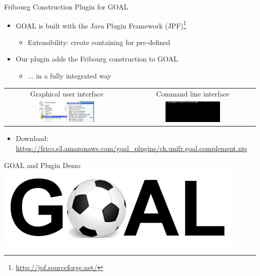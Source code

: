 \documentclass[12pt,handout]{beamer}
\begin{document}
\begin{frame}{Fribourg Construction Plugin for GOAL}
\begin{itemize}
\item GOAL is built with the Java Plugin Framework (JPF)\footnote{\scriptsize\url{http://jpf.sourceforge.net/}}
  \begin{itemize}
  \item Extensibility: create  containing  for pre-defined 
  \end{itemize}
\item Our plugin adds the Fribourg construction to GOAL
  \begin{itemize}
  \item $\dots$ in a fully integrated way
  \end{itemize}
\end{itemize}
\centering
\begin{tabular}{cc}
\footnotesize Graphical user interface & \footnotesize Command line interface \\
\includegraphics[width=0.46\textwidth]{figures/plugin_gui.png} &
\includegraphics[width=0.46\textwidth]{figures/plugin_cl.png}
\end{tabular}
\begin{itemize}
\item Download: \url{https://frico.s3.amazonaws.com/goal_plugins/ch.unifr.goal.complement.zip}
\end{itemize}
\end{frame}

\begin{frame}{GOAL and Plugin Demo}
\vspace{0.5cm}
\centering
\includegraphics[width=0.9\textwidth]{figures/goal_logo.png}
\end{frame}
\end{document}
